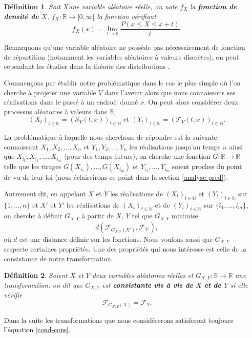 \documentclass[a4paper,11pt]{article}
\numberwithin{equation}{section}
\newtheorem{definition}{Définition}
\begin{document}
\begin{definition}
	Soit $X$une variable aléatoire réelle, on note $f_{X}$ la \textbf{fonction de densité de $X$}, $f_{X}: \mathbb{R}\to [0,\infty[$ la fonction vérifiant
	\begin{equation}
		f_{X}(x)=\lim_{t\to 0} \frac{P(x\leq X \leq x+t)}{t}.
	\end{equation}
\end{definition}
Remarquons qu'une variable aléatoire ne possède pas nécessairement de fonction de répartition (notamment les variables aléatoires à valeurs discrètes), on peut cependant les étudier dans la théorie des distributions \cite{golse2020distributions}.

Commençons par établir notre problématique dans le cas le plus simple où l'on cherche à projeter une variable $V$ dans l'avenir alors que nous connaissons ses réalisations dans le passé à un endroit donné $x$.
On peut alors considérer deux processus aléatoires à valeurs dans $\mathbb{R}$, 
\[(X_t)_{t \in \mathbb{N}}=(\mathcal{S}_{V}(t, x))_{t \in \mathbb{N}} \textrm{ et } (Y_t)_{t \in \mathbb{N}}=(\mathcal{T}_{V}(t, x))_{t \in \mathbb{N}}.\]

La problématique à laquelle nous cherchons de répondre est la suivante: connaissant $X_1,X_2,...,X_n$ et $Y_1,Y_2,...,Y_n$ les réalisations jusqu'au temps $n$ ainsi que $X_{i_1},X_{i_2},...,X_{i_m}$ (pour des temps futurs), on cherche une fonction $G: \mathbb{R} \to \mathbb{R}$ telle que les tirages $G(X_{i_1}),..., G(X_{i_m})$ et $Y_{i_1},...,Y_{i_m}$ soient proches du point de vu de leur loi (nous éclaircirons ce point dans la section \ref{analyse-pred}). 

Autrement dit, en appelant $X$ et $Y$ les réalisations de $(X_t)_{t \in \mathbb{N}}$ et $(Y_t)_{t \in \mathbb{N}}$ sur $\{1,...,n\}$ et $X'$ et $Y'$ les réalisations de $(X_t)_{t \in \mathbb{N}}$ et de $(Y_t)_{t \in \mathbb{N}}$ sur $\{i_1,...,i_m\}$, on cherche à définir $G_{X,Y}$ à partir de $X$, $Y$ tel que $G_{X,Y}$ minimise 
\[d(\mathcal{F}_{G_{X,Y}(X')}, \mathcal{F}_{Y'}),\]
où $d$ est une distance définie sur les fonctions.
Nous voulons aussi que $G_{X,Y}$ respecte certaines propriétés. Une des propriétés qui nous intéresse est celle de la consistance de notre transformation.

\begin{definition}
	Soient $X$ et $Y$ deux variables aléatoires réelles et $G_{X,Y}: \mathbb{R}\to \mathbb{R}$ une transformation, on dit que $G_{X,Y}$ est \textbf{consistante vis à vis de $X$ et de $Y$} si elle vérifie 
	\begin{equation}
		\label{cond-cons}
		{\mathcal{F}_{G_{X,Y}(X)}}= \mathcal{F}_{Y}.
	\end{equation}
\end{definition}
Dans la suite les transformations que nous considérerons satisferont toujours l'équation \eqref{cond-cons}.
\end{document}
